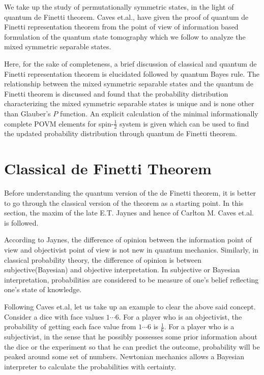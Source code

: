 We take up the study of permutationally symmetric states, in the light of quantum de Finetti theorem. Caves\cite{chap16-key8} et.al., have given the proof of quantum de Finetti representation theorem from the point of view of information based formulation of the quantum state tomography which we follow to analyze the mixed symmetric separable states. 

Here, for the sake of completeness, a brief discussion of classical and quantum de Finetti representation theorem is elucidated followed by quantum Bayes rule. The relationship between the mixed symmetric separable states and the quantum de Finetti theorem is discussed and found that the probability distribution characterizing the mixed symmetric separable states is unique and is none other than Glauber's $P$ function. An explicit calculation of the minimal informationally complete POVM elements for spin-$\frac{1}{2}$ system is given which can be used to find the updated probability distribution through quantum de Finetti theorem.

\section{Classical de Finetti Theorem}\label{chap16-sec2}

Before understanding the quantum version of the de Finetti theorem, it is better to go through the classical version of the theorem as a starting point. In this section, the maxim of the late E.T. Jaynes\cite{chap16-key9} and hence of Carlton M. Caves et.al.\cite{chap16-key8} is followed.

According to Jaynes, the difference of opinion between the information point of view and objectivist point of view is not new in quantum mechanics. Similarly, in classical probability theory, the difference of opinion is between subjective(Bayesian) and objective interpretation. In subjective or Bayesian interpretation, probabilities are considered to be measure of one's belief reflecting one's state of knowledge.

Following Caves et.al\cite{chap16-key8}, let us take up an example to clear the above said concept. Consider a dice with face values $1 \cdots 6$. For a player who is an objectivist, the probability of getting each face value from $1 \cdots 6$ is $\frac{1}{6}$. For a player who is a subjectivist, in the sense that he possibly possesses some prior information about the dice or the experiment so that he can predict the outcome, probability will be peaked around some set of numbers. Newtonian mechanics allows a Bayesian interpreter to calculate the probabilities with certainty.

